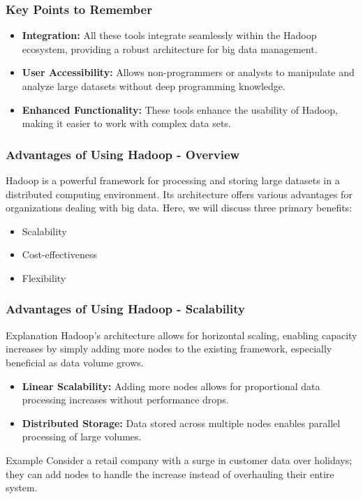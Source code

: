 \documentclass[aspectratio=169]{beamer}
\begin{document}
\begin{frame}
    \frametitle{Key Points to Remember}
    \begin{itemize}
        \item \textbf{Integration:} All these tools integrate seamlessly within the Hadoop ecosystem, providing a robust architecture for big data management.
        \item \textbf{User Accessibility:} Allows non-programmers or analysts to manipulate and analyze large datasets without deep programming knowledge.
        \item \textbf{Enhanced Functionality:} These tools enhance the usability of Hadoop, making it easier to work with complex data sets.
    \end{itemize}
\end{frame}

\begin{frame}[fragile]
    \frametitle{Advantages of Using Hadoop - Overview}
    Hadoop is a powerful framework for processing and storing large datasets in a distributed computing environment. Its architecture offers various advantages for organizations dealing with big data. Here, we will discuss three primary benefits: 
    \begin{itemize}
        \item Scalability
        \item Cost-effectiveness
        \item Flexibility
    \end{itemize}
\end{frame}

\begin{frame}[fragile]
    \frametitle{Advantages of Using Hadoop - Scalability}
    \begin{block}{Explanation}
        Hadoop's architecture allows for horizontal scaling, enabling capacity increases by simply adding more nodes to the existing framework, especially beneficial as data volume grows.
    \end{block}
    
    \begin{itemize}
        \item \textbf{Linear Scalability:} Adding more nodes allows for proportional data processing increases without performance drops.
        \item \textbf{Distributed Storage:} Data stored across multiple nodes enables parallel processing of large volumes.
    \end{itemize}
    
    \begin{block}{Example}
        Consider a retail company with a surge in customer data over holidays; they can add nodes to handle the increase instead of overhauling their entire system.
    \end{block}
\end{frame}
\end{document}
